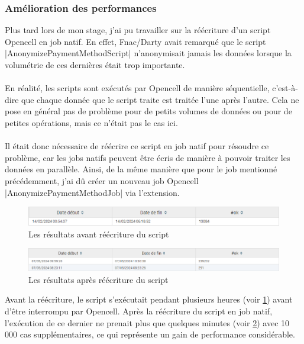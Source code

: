 \documentclass[12pt, a4paper]{report}
\begin{document}
	\newpage
	\subsubsection{Amélioration des performances}
	\label{s:amelioration_performances}

	Plus tard lors de mon stage, j'ai pu travailler sur la réécriture d'un script Opencell en job natif. En effet, Fnac/Darty avait remarqué que le script \cverb|AnonymizePaymentMethodScript| n'anonymisait jamais les données lorsque la volumétrie de ces dernières était trop importante.
	\\\\
	En réalité, les scripts sont exécutés par Opencell de manière séquentielle, c'est-à-dire que chaque donnée que le script traite est traitée l'une après l'autre. Cela ne pose en général pas de problème pour de petits volumes de données ou pour de petites opérations, mais ce n'était pas le cas ici.	
	\\\\
	Il était donc nécessaire de réécrire ce script en job natif pour résoudre ce problème, car les jobs natifs peuvent être écris de manière à pouvoir traiter les données en parallèle. Ainsi, de la même manière que pour le job mentionné précédemment, j'ai dû créer un nouveau job Opencell \cverb|AnonymizePaymentMethodJob| via l'extension. 
	
	\begin{figure}[!h]
		\centering
		\includegraphics[width=1\textwidth]{assets/images/abo_3845_before.png}
		\vspace{-.6cm}
		\caption{Les résultats avant réécriture du script}
		\label{fig:abo_3845_before}
	\end{figure}

	\begin{figure}[!h]
		\centering
		\includegraphics[width=1\textwidth]{assets/images/abo_3845_after.png}
		\vspace{-.6cm}
		\caption{Les résultats après réécriture du script}
		\label{fig:abo_3845_after}
	\end{figure}

	\noindent
	Avant la réécriture, le script s'exécutait pendant plusieurs heures (voir \ref{fig:abo_3845_before}) avant d'être interrompu par Opencell. Après la réécriture du script en job natif, l'exécution de ce dernier ne prenait plus que quelques minutes (voir \ref{fig:abo_3845_after}) avec 10 000 cas supplémentaires, ce qui représente un gain de performance considérable.
	
\end{document}
